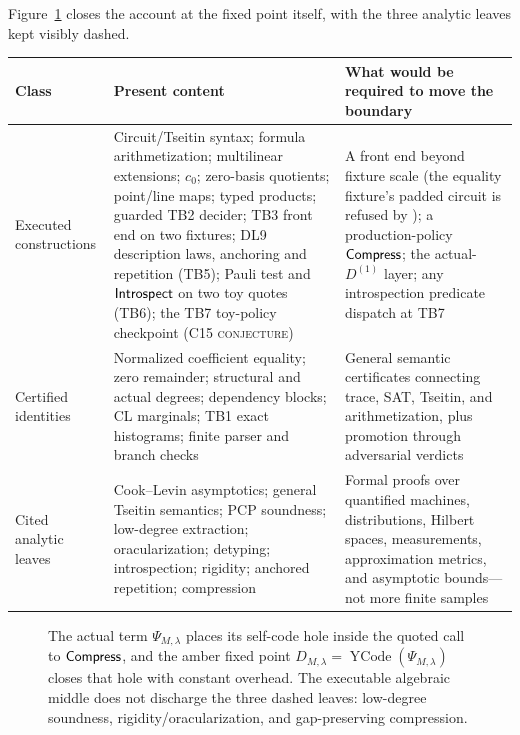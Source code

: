 Figure~\ref{fig:final-accounting} closes the account at the fixed point itself,
with the three analytic leaves kept visibly dashed.

\begin{center}
\small
\begin{tabularx}{\textwidth}{P{0.20\textwidth}P{0.35\textwidth}X}
\toprule
Class & Present content & What would be required to move the boundary \\
\midrule
Executed constructions
& Circuit/Tseitin syntax; formula arithmetization; multilinear extensions;
\(c_0\); zero-basis quotients; point/line maps; typed products; guarded TB2
decider; TB3 front end on two fixtures; DL9 description laws, anchoring and
repetition (TB5); Pauli test and \(\mathsf{Introspect}\) on two toy quotes (TB6);
the TB7 toy-policy checkpoint (C15 \textsc{conjecture})
& A front end beyond fixture scale (the equality fixture's padded circuit is
refused by ); a production-policy \(\mathsf{Compress}\); the
actual-\(D^{(1)}\)  layer; any introspection predicate
dispatch at TB7 \\
Certified identities
& Normalized coefficient equality; zero remainder; structural and actual
degrees; dependency blocks; CL marginals; TB1 exact histograms; finite parser
and branch checks
& General semantic certificates connecting trace, SAT, Tseitin, and
arithmetization, plus promotion through adversarial verdicts \\
Cited analytic leaves
& Cook--Levin asymptotics; general Tseitin semantics; PCP soundness;
low-degree extraction; oracularization; detyping; introspection; rigidity;
anchored repetition; compression
& Formal proofs over quantified machines, distributions, Hilbert spaces,
measurements, approximation metrics, and asymptotic bounds---not more finite
samples \\
\bottomrule
\end{tabularx}
\end{center}
\begin{figure}[t]
\centering

\caption{The actual term \(\Psi_{M,\lambda}\) places its self-code hole inside the quoted call to \(\mathsf{Compress}\), and the amber fixed point \(D_{M,\lambda}=\operatorname{YCode}(\Psi_{M,\lambda})\) closes that hole with constant overhead.  The executable algebraic middle does not discharge the three dashed leaves: low-degree soundness, rigidity/oracularization, and gap-preserving compression.}
\label{fig:final-accounting}
\end{figure}

